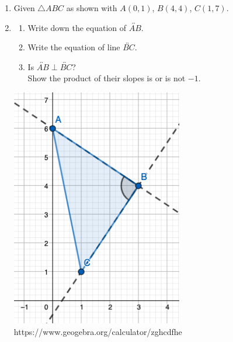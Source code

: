 \begin{enumerate}
\item Given $\triangle ABC$ as shown with $A(0,1)$, $B(4,4)$, $C(1,7)$.
\item \begin{multicols}{2}
  \begin{enumerate}
    \item Write down the equation of $\overleftrightarrow{AB}$.
    \item Write the equation of line $\overleftrightarrow{BC}$.
    \item Is $\overleftrightarrow{AB} \perp \overleftrightarrow{BC}$? \\[1cm]
    Show the product of their slopes is or is not $-1$. \\[3cm]
    \end{enumerate}
\columnbreak
    \includegraphics[width=7.5cm]{../graphics/06triangle.png}
    https://www.geogebra.org/calculator/zghcdfhe
\end{multicols}


\end{enumerate}
